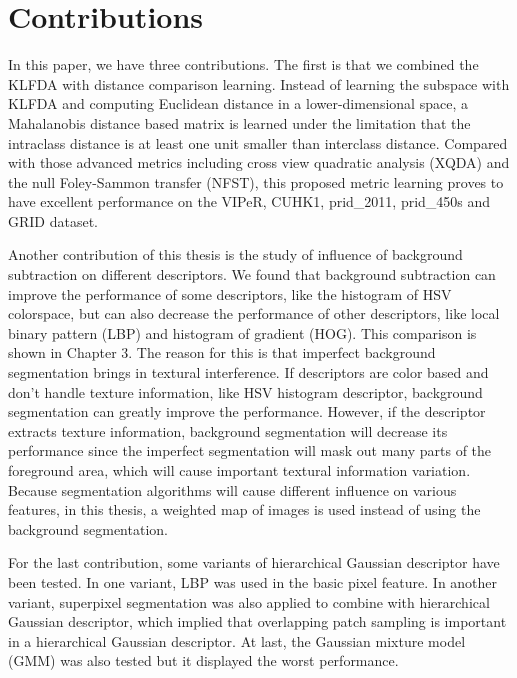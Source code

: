 \section{Contributions}

In this paper, we have three contributions. The first is that we combined the KLFDA with distance comparison learning. Instead of learning the subspace with KLFDA and computing Euclidean distance in a lower-dimensional space, a Mahalanobis distance based matrix is learned under the limitation that the intraclass distance is at least one unit smaller than interclass distance. Compared with those advanced metrics including cross view quadratic analysis (XQDA) \cite{LOMO} and the null Foley-Sammon transfer (NFST), this proposed metric learning proves to have excellent performance on the VIPeR, CUHK1, prid\_2011, prid\_450s and GRID dataset.

Another contribution of this thesis is the study of influence of background subtraction on different descriptors. We found that background subtraction can improve the performance of some descriptors, like the histogram of HSV colorspace, but can also decrease the performance of  other descriptors, like local binary pattern (LBP) and histogram of gradient (HOG). This comparison is shown in Chapter 3. The reason for this is that imperfect background segmentation brings in textural interference. If descriptors are color based and don't handle texture information, like HSV histogram descriptor, background segmentation can greatly improve the performance. However, if the descriptor extracts texture information, background segmentation will decrease its performance since the imperfect segmentation will mask out many parts of the foreground area, which will cause important textural information variation. Because segmentation algorithms will cause different influence on various features, in this thesis, a weighted map of images is used instead of using the background segmentation.

For the last contribution, some variants of hierarchical Gaussian descriptor have been tested. In one variant, LBP was used in the basic pixel feature. In another variant, superpixel segmentation was also applied to combine with hierarchical Gaussian descriptor, which implied that overlapping patch sampling is important in a hierarchical Gaussian descriptor. At last, the Gaussian mixture model (GMM) was also tested but it displayed the worst performance.

